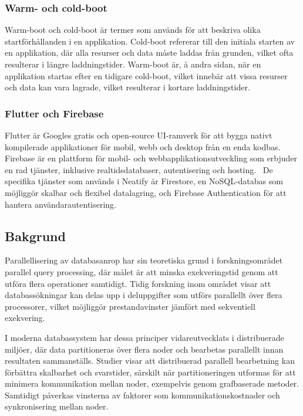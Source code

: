 \documentclass[letterpaper,twocolumn,10pt]{article}
\begin{document}
\subsubsection{Warm- och cold-boot}

Warm-boot och cold-boot är termer som används för att beskriva olika startförhållanden i en applikation. Cold-boot refererar till den initiala starten av en applikation, där alla resurser och data måste laddas från grunden, vilket ofta resulterar i längre laddningstider. Warm-boot är, å andra sidan, när en applikation startas efter en tidigare cold-boot, vilket innebär att vissa resurser och data kan vara lagrade, vilket resulterar i kortare laddningstider.

\subsubsection{Flutter och Firebase}
Flutter är Googles gratis och open-source UI-ramverk för att
bygga nativt kompilerade applikationer för mobil, webb och desktop från en enda
kodbas.~\cite{flutter_faq}\\[0.5\baselineskip]
Firebase är en plattform för mobil- och webbapplikationsutveckling som erbjuder en rad tjänster, inklusive realtidsdatabaser, autentisering och hosting.~\cite{firebase_docs} De specifika tjänster som används i Neatify är Firestore, en NoSQL-databas som möjliggör skalbar och flexibel datalagring, och Firebase Authentication för att hantera användarautentisering.~\cite{firestore_docs}~\cite{firebase_auth_docs}

\subsection{Bakgrund}

Parallellisering av databasanrop har sin teoretiska grund i forskningsområdet
parallel query processing, där målet är att minska exekveringstid genom att
utföra flera operationer samtidigt. Tidig forskning inom området visar att
databassökningar kan delas upp i deluppgifter som utförs parallellt över flera
processorer, vilket möjliggör prestandavinster jämfört med sekventiell
exekvering.~\cite{dewitt1992parallel}

I moderna databassystem har dessa principer vidareutvecklats i distribuerade
miljöer, där data partitioneras över flera noder och bearbetas parallellt innan
resultaten sammanställs. Studier visar att distribuerad parallell bearbetning kan
förbättra skalbarhet och svarstider, särskilt när partitioneringen utformas för
att minimera kommunikation mellan noder, exempelvis genom grafbaserade metoder.
Samtidigt påverkas vinsterna av faktorer som kommunikationskostnader och synkronisering
mellan noder.~\cite{nam2019parallel}
\end{document}
